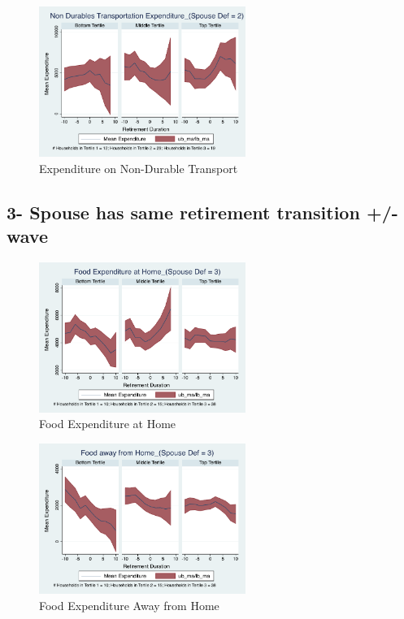 \documentclass[11pt]{article}
\begin{document}
\begin{figure}[h]
	\caption{Expenditure on Non-Durable Transport}
	\centering
	\includegraphics[width=0.6\textwidth]{../ConsumptionPostRetirement_by_SpouseDef_Cats/Smoothed/2/spouse_def_total_transport_real.pdf}
\end{figure}
\clearpage


\subsection{3- Spouse has same retirement transition +/- wave}

\begin{figure}[h]
	\caption{Food Expenditure at Home}
	\centering
	\includegraphics[width=0.6\textwidth]{../ConsumptionPostRetirement_by_SpouseDef_Cats/Smoothed/3/spouse_def_total_foodexp_home_real.pdf}
\end{figure}


\begin{figure}[h]
	\caption{Food Expenditure Away from Home}
	\centering
	\includegraphics[width=0.6\textwidth]{../ConsumptionPostRetirement_by_SpouseDef_Cats/Smoothed/3/spouse_def_total_foodexp_away_real.pdf}
\end{figure}
\end{document}
